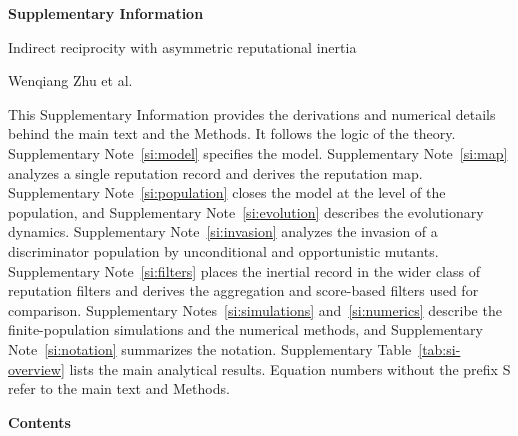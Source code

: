 \documentclass[10pt]{wlscirep}
\theoremstyle{plain}
\theoremstyle{remark}
\begin{document}
{\raggedright\sffamily\bfseries\fontsize{20}{25}\selectfont Supplementary Information\par}
\vskip6pt
{\raggedright\sffamily\fontsize{12}{16}\selectfont Indirect reciprocity with asymmetric reputational inertia\par}
\vskip4pt
{\raggedright\sffamily\fontsize{11}{14}\selectfont Wenqiang Zhu et al.\par}
\vskip14pt

This Supplementary Information provides the derivations and numerical details behind the main text and the Methods. It follows the logic of the theory. Supplementary Note~\ref{si:model} specifies the model. Supplementary Note~\ref{si:map} analyzes a single reputation record and derives the reputation map. Supplementary Note~\ref{si:population} closes the model at the level of the population, and Supplementary Note~\ref{si:evolution} describes the evolutionary dynamics. Supplementary Note~\ref{si:invasion} analyzes the invasion of a discriminator population by unconditional and opportunistic mutants. Supplementary Note~\ref{si:filters} places the inertial record in the wider class of reputation filters and derives the aggregation and score-based filters used for comparison. Supplementary Notes~\ref{si:simulations} and~\ref{si:numerics} describe the finite-population simulations and the numerical methods, and Supplementary Note~\ref{si:notation} summarizes the notation. Supplementary Table~\ref{tab:si-overview} lists the main analytical results. Equation numbers without the prefix S refer to the main text and Methods.

\startcontents[si]
\vskip10pt
{\sffamily\bfseries\large Contents\par}
\vskip4pt
\vskip12pt
\end{document}
